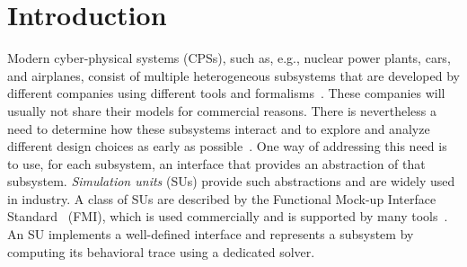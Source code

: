 %
%
%
%
%

\section{Introduction}

Modern  cyber-physical systems (CPSs),  such as,  e.g.,  nuclear power
plants, cars, and airplanes, consist of multiple
heterogeneous subsystems that    are developed by different
companies using different tools and formalisms~\cite{Paris19}.
These companies will usually not share their models for commercial reasons.
There is nevertheless  a need to determine   how
these subsystems 
interact and to  explore and analyze different design choices as early
as possible~\cite{4519604}. 
One way of addressing this need is to use, for each subsystem,  an
interface that provides an abstraction of that subsystem. 
\emph{Simulation
units} (SUs) provide such abstractions and are widely used in
industry. A class  of SUs are   described by
the Functional  Mock-up Interface Standard~\cite{FMI2014} (FMI), which
is used commercially and is  supported by many
tools~\cite{Tools_FMI}. 
An SU implements a well-defined interface and represents a subsystem
by computing   its behavioral trace using a dedicated solver.


